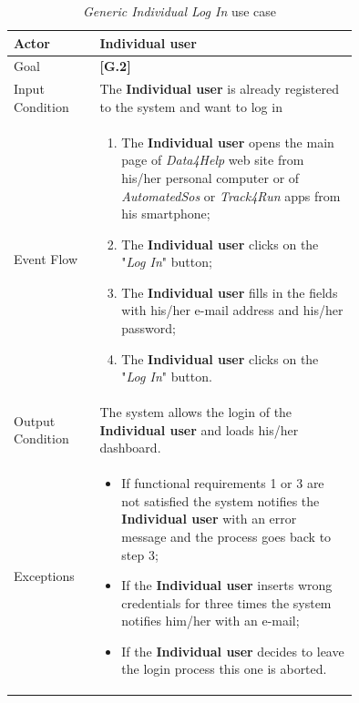 \begin{center}
\begin{table}
\begin{tabular}{ | l | p{0.75\linewidth} | }
  \hline
    Actor & \textbf{Individual user} \\ \hline
    Goal & \textbf{[G.2]} \\ \hline
    Input Condition & The \textbf{Individual user} is already registered to the system and want to log in \\ \hline
    Event Flow & \begin{minipage}[t]{0.7\textwidth}
      \begin{enumerate}
        \item The \textbf{Individual user} opens the main page of \textit{Data4Help} web site from his/her personal computer or of \textit{AutomatedSos} or \textit{Track4Run} apps from his smartphone;
        \item The \textbf{Individual user} clicks on the "\textit{Log In}" button;
        \item The \textbf{Individual user} fills in the fields with his/her e-mail address and his/her password;
        \item The \textbf{Individual user} clicks on the "\textit{Log In}" button.
      \end{enumerate}
    \smallskip
  \end{minipage} \\ \hline
  Output Condition & The system allows the login of the \textbf{Individual user} and loads his/her dashboard. \\ \hline
  Exceptions & \begin{minipage}[t]{0.7\textwidth}
    \begin{itemize}
      \smallskip
      \item If functional requirements 1 or 3 are not satisfied the system notifies the \textbf{Individual user} with an error message and the process goes back to step 3;
      \item If the \textbf{Individual user} inserts wrong credentials for three times the system notifies him/her with an e-mail;
      \item If the \textbf{Individual user} decides to leave the login process this one is aborted.
    \end{itemize}
    \smallskip
  \end{minipage}  \\ \hline
\end{tabular}
\caption{\textit{Generic Individual Log In} use case}
\label{table:genericIndividualLogInInTable}
\end{table}
\end{center}

